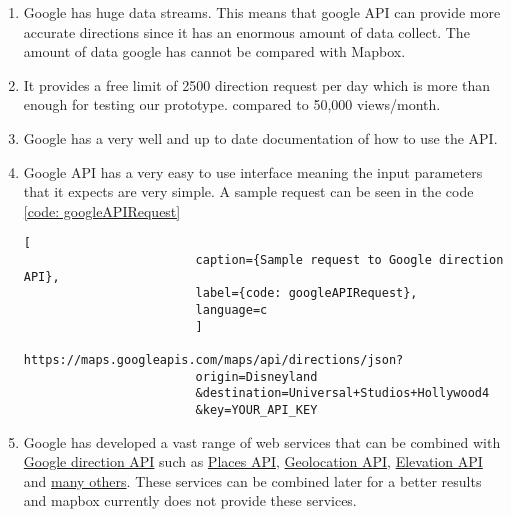             \begin{enumerate}  
                \item 
                    Google has huge data streams. This means that google API can provide more
                    accurate directions since it has an enormous amount of data collect. The amount
                    of data google has cannot be compared with Mapbox.
                \item
                    It provides a free limit of 2500 direction request per day which is more than enough for testing our prototype.
                    compared to  50,000 views/month.
                \item
                    Google has a very well and up to date documentation of how to use the API.  
                \item
                    Google API has a very easy to use interface meaning the input 
                    parameters that it expects are very simple. 
                    A sample request can be seen in the code \ref{code: googleAPIRequest}
                    \begin{lstlisting}[
                        caption={Sample request to Google direction API}, 
                        label={code: googleAPIRequest},
                        language=c
                        ]
                        https://maps.googleapis.com/maps/api/directions/json?
                        origin=Disneyland
                        &destination=Universal+Studios+Hollywood4
                        &key=YOUR_API_KEY
                    \end{lstlisting}   
                \item 
                    Google has developed a vast range of web services that can be
                    combined with \href{https://developers.google.com/maps/documentation/directions/start}
                    {Google direction API} such as \href{https://developers.google.com/places/} 
                    {Places API}, \href{https://developers.google.com/maps/documentation/geolocation/intro}
                    {Geolocation API}, \href{https://developers.google.com/maps/documentation/elevation/start}
                    {Elevation API} and \href{https://developers.google.com/places/documentation/} {many others}. 
                    These services can be combined later for a better results and mapbox 
                    currently does not provide these services. 
            \end{enumerate}